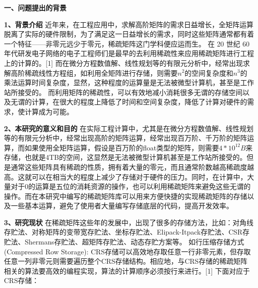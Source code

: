 \documentclass{article}
\begin{document}
  




\textbf{一、问题提出的背景}
      \qquad
\newline
    
     \textbf{1、背景介绍}
     \qquad
      近年来，在工程应用中，求解高阶矩阵的需求日益增长，全矩阵运算脱离了实际的硬件限制，为了满足这一日益增长的需求，同时这些矩阵通常都有着一个特征——非零元远少于零元，稀疏矩阵这门学科便应运而生。
在 20 世纪 60 年代研发电子网络的电子工程师们是最早的去利用稀疏性来应用稀疏矩阵进行工程上的计算的。[1]
而在微分方程数值解、线性规划等的有限元分析中，经常出现求解高阶稀疏线性方程组，如利用全矩阵进行存储，则需要$n^2$的空间复杂度和$n^3$的乘法运算时间复杂度，显然，这种程度的运算量是无法被微型计算机，甚至是工作站所接受的。
而利用矩阵的稀疏性，可以有效地减小消耗很多无谓的存储空间以及无谓的计算，在很大的程度上降低了时间和空间复杂度，降低了计算对硬件的需求，使计算成为可能。
\newline

 \textbf{2、本研究的意义和目的}
 \newline
 在实际工程计算中，尤其是在微分方程数值解、线性规划等的有限元分析中，经常出现高阶的矩阵运算，经常出现百万阶、千万阶的矩阵运算，而如果使用全矩阵运算，假设是百万阶的float类型的矩阵，则需要$4*10^{12}B$来存储，也就是4TB的空间，这显然是无法被微型计算机甚至是工作站所接受的。但是通常这些矩阵具有稀疏的性质，拥有着大量的零元，而且通常阶数越高稀疏度越高。这就可以在相当大的程度上减少了存储对于硬件的压力。同时，在计算中，大量对于0的运算是五位的消耗资源的操作，也可以利用稀疏矩阵来避免这些无谓的操作。而在本研究中编写的稀疏矩阵库可以用来方便快捷的实现稀疏矩阵的存储以及一些基本运算，避免了使用者大量编写存储底层的代码，提高开发效率。\newline
 
\textbf{3、研究现状}\newline
在稀疏矩阵这些年的发展中，出现了很多的存储方法，比如：对角线存贮法、对称矩阵的变带宽存贮法、坐标存贮法、Elipack-Itpack存贮法、CSR存贮法、Shermans存贮法、超矩阵存贮法、动态存贮方案等。\newline
如行压缩存储方式(Compressed Row Storage):
CRS存储可以高效地存取任意一行非零元素，但存取任意一列非零元则需要遍历整个CRS存储结构。相应地，与CRS存储的稀疏矩阵相关的算法要高效的编程实现，算法的计算顺序必须按行来进行。[1]
下面对应于CRS存储：
\newline\newline\newline\newline\newline\newline\newline\newline
\end{document}
